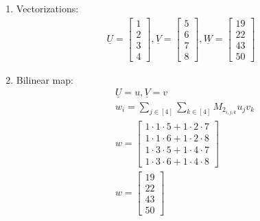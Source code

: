\documentclass[11pt,a4paper]{article}
\begin{document}
\begin{enumerate}
\begin{enumerate}
              \item Vectorizations:
                    \begin{align*}
                        \underline{U} = \begin{bmatrix}
                                            1 \\ 2 \\ 3 \\ 4
                                        \end{bmatrix},
                        \underline{V} = \begin{bmatrix}
                                            5 \\ 6 \\ 7 \\ 8
                                        \end{bmatrix},
                        \underline{W} = \begin{bmatrix}
                                            19 \\ 22 \\ 43 \\ 50
                                        \end{bmatrix}
                    \end{align*}
              \item Bilinear map:
                    \begin{align*}
                         & \underline{U} = u, \underline{V} = v                          \\
                         & w_i = \sum_{j \in [4]}\sum_{k \in [4]}M_{2_{i, j, k}} u_j v_k \\
                         & w = \begin{bmatrix}
                                   1 \cdot 1 \cdot 5 + 1 \cdot 2 \cdot 7 \\
                                   1 \cdot 1 \cdot 6 + 1 \cdot 2 \cdot 8 \\
                                   1 \cdot 3 \cdot 5 + 1 \cdot 4 \cdot 7 \\
                                   1 \cdot 3 \cdot 6 + 1 \cdot 4 \cdot 8
                               \end{bmatrix}                     \\
                         & w = \begin{bmatrix}
                                   19 \\ 22 \\ 43 \\ 50

\end{bmatrix}
\end{align*}
\end{enumerate}
\end{enumerate}
\end{document}

